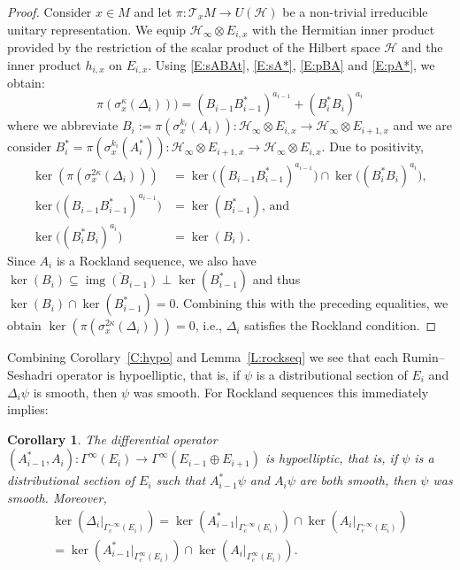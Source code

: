 \documentclass[reqno,12pt]{amsart}
\DeclareMathOperator{\img}{img}
\theoremstyle{plain}
\newtheorem{corollary}[theorem]{Corollary}
\theoremstyle{definition}
\begin{document}
\begin{proof}
Consider $x\in M$ and let $\pi\colon\mathcal T_xM\to U(\mathcal H)$ be a non-trivial irreducible unitary representation.
We equip $\mathcal H_\infty\otimes E_{i,x}$ with the Hermitian inner product provided by the restriction of the scalar product of the Hilbert space $\mathcal H$ and the inner product $h_{i,x}$ on $E_{i,x}$.
Using \eqref{E:sABAt}, \eqref{E:sA*}, \eqref{E:pBA} and \eqref{E:pA*}, we obtain:
$$
\pi(\sigma^\kappa_x(\Delta_i)))
=(B_{i-1}B_{i-1}^*)^{a_{i-1}}+(B_i^*B_i)^{a_i}
$$
where we abbreviate $B_i:=\pi(\sigma_x^{k_i}(A_i))\colon\mathcal H_\infty\otimes E_{i,x}\to\mathcal H_\infty\otimes E_{i+1,x}$ and we are consider $B_i^*=\pi(\sigma_x^{k_i}(A_i^*))\colon\mathcal H_\infty\otimes E_{i+1,x}\to\mathcal H_\infty\otimes E_{i,x}$.
Due to positivity,
\begin{align*}
\ker(\pi(\sigma_x^{2\kappa}(\Delta_i)))
&=\ker\bigl((B_{i-1}B_{i-1}^*)^{a_{i-1}}\bigr)
\cap\ker\bigl((B_i^*B_i)^{a_i}\bigr),
\\
\ker\bigl((B_{i-1}B_{i-1}^*)^{a_{i-1}}\bigr)
&=\ker(B_{i-1}^*)\textrm{, and}
\\
\ker\bigl((B_i^*B_i)^{a_i}\bigr)
&=\ker(B_i).
\end{align*}
Since $A_i$ is a Rockland sequence, we also have $\ker(B_i)\subseteq\overline{\img(B_{i-1})}\perp\ker(B_{i-1}^*)$ and thus $\ker(B_i)\cap\ker(B_{i-1}^*)=0$.
Combining this with the preceding equalities, we obtain $\ker(\pi(\sigma_x^{2\kappa}(\Delta_i)))=0$, i.e., $\Delta_i$ satisfies the Rockland condition.
\end{proof}


Combining Corollary~\ref{C:hypo} and Lemma~\ref{L:rockseq} we see that each Rumin--Seshadri operator is hypoelliptic, that is, if $\psi$ is a distributional section of $E_i$ and $\Delta_i\psi$ is smooth, then $\psi$ was smooth.
For Rockland sequences this immediately implies:


\begin{corollary}\label{C:RShypo}
The differential operator $(A_{i-1}^*,A_i)\colon\Gamma^\infty(E_i)\to\Gamma^\infty(E_{i-1}\oplus E_{i+1})$ is hypoelliptic, that is, if $\psi$ is a distributional section of $E_i$ such that $A_{i-1}^*\psi$ and $A_i\psi$ are both smooth, then $\psi$ was smooth.
Moreover,
\begin{multline}\label{E:kerDAA}
\ker(\Delta_i|_{\Gamma^{-\infty}_c(E_i)})
=\ker(A_{i-1}^*|_{\Gamma^{-\infty}_c(E_i)})\cap\ker(A_i|_{\Gamma^{-\infty}_c(E_i)})
\\=\ker(A_{i-1}^*|_{\Gamma^\infty_c(E_i)})\cap\ker(A_i|_{\Gamma^\infty_c(E_i)}).
\end{multline}
\end{corollary}
\end{document}
